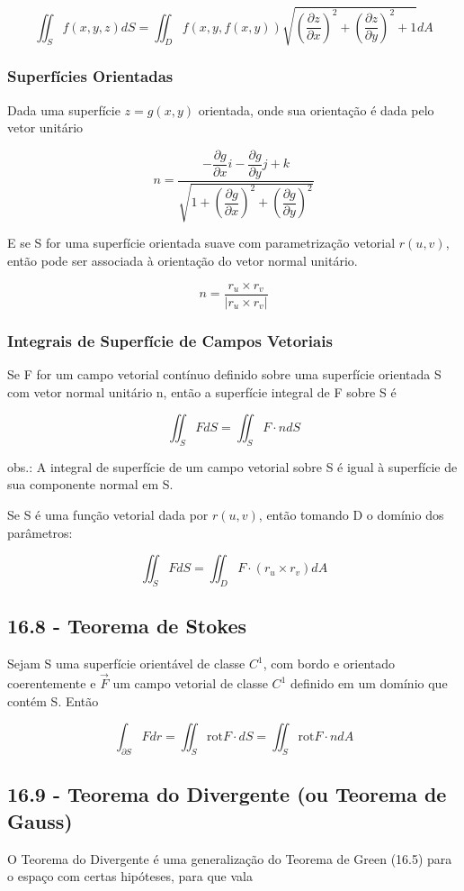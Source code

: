 \documentclass[12pt]{article}
\begin{document}
$$\iint_S f(x, y, z) dS = \iint_D f(x, y, f(x, y)) \sqrt{\left(\frac{\partial z}{\partial x}\right)^2 + \left(\frac{\partial z}{\partial y}\right)^2 + 1} dA$$

\subsubsection*{Superfícies Orientadas}
Dada uma superfície $z = g(x, y)$ orientada, onde sua orientação é dada pelo vetor unitário

$$n = \dfrac{-\dfrac{\partial g}{\partial x}i - \dfrac{\partial g}{\partial y}j + k}{\sqrt{1 + \left(\dfrac{\partial g}{\partial x}\right)^2 + \left(\dfrac{\partial g}{\partial y}\right)^2}}$$

E se S for uma superfície orientada suave com parametrização vetorial $r(u, v)$, então pode ser associada à orientação do vetor normal unitário.

$$n = \dfrac{r_u \times r_v}{|r_u \times r_v|}$$

\subsubsection*{Integrais de Superfície de Campos Vetoriais}

Se F for um campo vetorial contínuo definido sobre uma superfície orientada S com vetor normal unitário n, então a superfície integral de F sobre S é

$$\iint_S F d S = \iint_S F \cdot n d S$$

obs.: A integral de superfície de um campo vetorial sobre S é igual à superfície de sua componente normal em S.

Se S é uma função vetorial dada por $r(u, v)$, então tomando D o domínio dos parâmetros:

$$\iint_S F dS = \iint_D F \cdot (r_u \times r_v) d A$$

\subsection*{16.8 - Teorema de Stokes}
Sejam S uma superfície orientável de classe $C^1$, com bordo e orientado coerentemente e $\Vec{F}$ um campo vetorial de classe $C^1$ definido em um domínio que contém S. Então

$$\int_{\partial S} F d r = \iint_S \text{rot} F \cdot d S =  \iint_S \text{rot} F \cdot n d A$$

\subsection*{16.9 - Teorema do Divergente (ou Teorema de Gauss)}
O Teorema do Divergente é uma generalização do Teorema de Green (16.5) para o espaço com certas hipóteses, para que vala 
\end{document}
